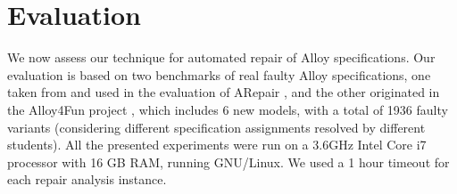 \section{Evaluation}

We now assess our technique for automated repair of Alloy specifications. Our evaluation is based on two benchmarks of real faulty Alloy specifications, one taken from \cite{Nelson+2017} and used in the evaluation of ARepair \cite{Wang+2018}, and the other originated in the Alloy4Fun project \cite{Macedo+2020}, which includes 6 new models, with a total of 1936 faulty variants (considering different specification assignments resolved by different students). All the presented experiments were run on a 3.6GHz Intel Core i7 processor with 16 GB RAM, running GNU/Linux. We used a 1 hour timeout for each repair analysis instance. 

